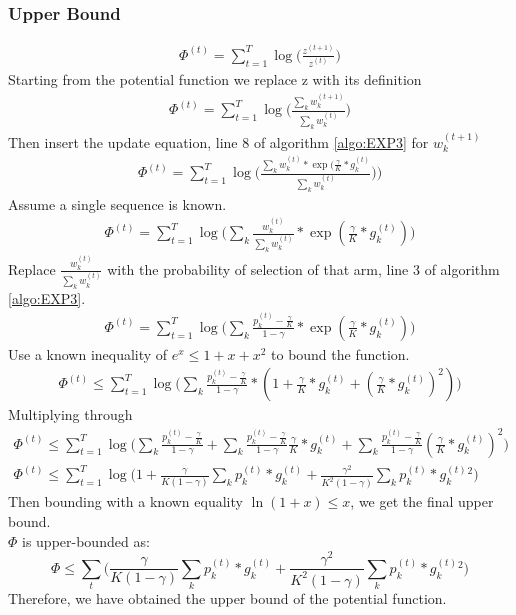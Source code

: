 \documentclass[11pt]{article}
\begin{document}
\subsubsection{Upper Bound}

\begin{align}
  \Phi^{(t)} = \sum_{t=1}^T \log \big(\frac{z^{(t+1)}}{z^{(t)}}\big)  
\end{align}
Starting from the potential function we replace z with its definition
\begin{align}
  \Phi^{(t)} = \sum_{t=1}^T \log \big(\frac{\sum_kw_k^{(t+1)}}{\sum_kw_k^{(t)}}\big)  
\end{align}
Then insert the update equation, line 8 of algorithm \ref{algo:EXP3} for $w_k^{(t+1)}$
\begin{align}
  \Phi^{(t)} = \sum_{t=1}^T \log \big(\frac{\sum_kw_k^{(t)}*\exp(\frac{\gamma}{K}*g_k^{(t)}}{\sum_kw_k^{(t)}})\big)  
\end{align}
Assume a single sequence is known.
\begin{align}
  \Phi^{(t)} = \sum_{t=1}^T \log \big(\sum_k\frac{w_k^{(t)}}{\sum_kw_k^{(t)}}*\exp(\frac{\gamma}{K}*g_k^{(t)})\big)  
\end{align}
Replace $\frac{w_k^{(t)}}{\sum_kw_k^{(t)}}$ with the probability of selection of that arm, line 3 of algorithm \ref{algo:EXP3}.
\begin{align}
  \Phi^{(t)} = \sum_{t=1}^T \log \big(\sum_k\frac{p_k^{(t)}-\frac{\gamma}{K}}{1-\gamma}*\exp(\frac{\gamma}{K}*g_k^{(t)})\big)  
\end{align}
Use a known inequality of $e^x\leq1+x+x^2$ to bound the function.
\begin{align}
  \Phi^{(t)} \leq \sum_{t=1}^T \log \big(\sum_k\frac{p_k^{(t)}-\frac{\gamma}{K}}{1-\gamma}*(1+\frac{\gamma}{K}*g_k^{(t)}+(\frac{\gamma}{K}*g_k^{(t)})^2)\big)  
\end{align}
Multiplying through
\begin{align}
  \Phi^{(t)} \leq \sum_{t=1}^T \log \big(\sum_k\frac{p_k^{(t)}-\frac{\gamma}{K}}{1-\gamma}+\sum_k\frac{p_k^{(t)}-\frac{\gamma}{K}}{1-\gamma}\frac{\gamma}{K}*g_k^{(t)}+\sum_k\frac{p_k^{(t)}-\frac{\gamma}{K}}{1-\gamma}(\frac{\gamma}{K}*g_k^{(t)})^2\big)\\
  \Phi^{(t)} \leq \sum_{t=1}^T \log \big(1+\frac{\gamma}{K(1-\gamma)}\sum_k p_k^{(t)}*g_k^{(t)}+\frac{\gamma^2}{K^2(1-\gamma)}\sum_k p_k^{(t)}*g_k^{(t)}^2\big)
\end{align}
Then bounding with a known equality $\ln(1+x)\leq x$, we get the final upper bound.\\
$\Phi$ is upper-bounded as:
$$\Phi\leq \sum_t\big(\frac{\gamma}{K(1-\gamma)}\sum_kp_k^{(t)}*g_k^{(t)}+\frac{\gamma^2}{K^2(1-\gamma)}\sum_kp_k^{(t)}*g_k^{(t)}^2\big)$$\label{theorem:upperEXP3}
Therefore, we have obtained the upper bound of the potential function.
\end{document}

